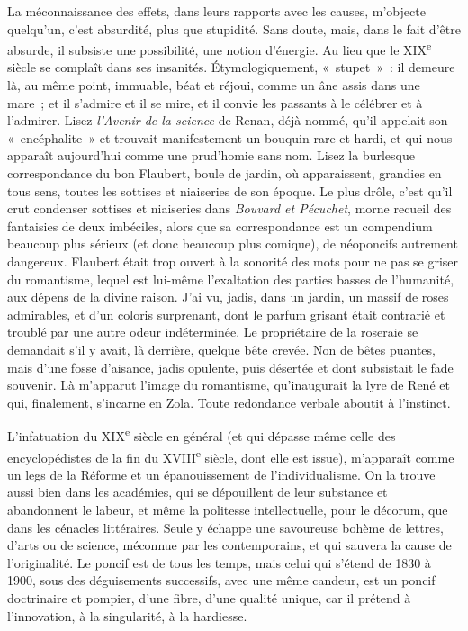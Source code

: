 \documentclass[french,twoside]{book} %
\begin{document}
La méconnaissance des effets, dans leurs rapports avec les causes, m’objecte quelqu’un, c’est absurdité, plus que stupidité. Sans doute, mais, dans le fait d’être absurde, il subsiste une possibilité, une notion d’énergie. Au lieu que le XIX\textsuperscript{e} siècle se complaît dans ses insanités. Étymologiquement, « stupet » : il demeure là, au même point, immuable, béat et réjoui, comme un âne assis dans une mare ; et il s’admire et il se mire, et il convie les passants à le célébrer et à l’admirer. Lisez {\itshape l’Avenir de la science} de Renan, déjà nommé, qu’il appelait son « encéphalite » et trouvait manifestement un bouquin rare et hardi, et qui nous apparaît aujourd’hui comme une prud’homie sans nom. Lisez la burlesque correspondance du bon Flaubert, boule de jardin, où apparaissent, grandies en tous sens, toutes les sottises et niaiseries de son époque. Le plus drôle, c’est qu’il crut condenser sottises et niaiseries dans {\itshape Bouvard et Pécuchet}, morne recueil des fantaisies de deux imbéciles, alors que sa correspondance est un compendium beaucoup plus sérieux (et donc beaucoup plus comique), de néoponcifs autrement dangereux. Flaubert était trop ouvert à la sonorité des mots pour ne pas se griser du romantisme, lequel est lui-même l’exaltation des parties basses de l’humanité, aux dépens de la divine raison. J’ai vu, jadis, dans un jardin, un massif de roses admirables, et d’un coloris surprenant, dont le parfum grisant était contrarié et troublé par une autre odeur indéterminée. Le propriétaire de la roseraie se demandait s’il y avait, là derrière, quelque bête crevée. Non de bêtes puantes, mais d’une fosse d’aisance, jadis opulente, puis désertée et dont subsistait le fade souvenir. Là m’apparut l’image du romantisme, qu’inaugurait la lyre de René et qui, finalement, s’incarne en Zola. Toute redondance verbale aboutit à l’instinct.\par
L’infatuation du XIX\textsuperscript{e} siècle en général (et qui dépasse même celle des encyclopédistes de la fin du XVIII\textsuperscript{e} siècle, dont elle est issue), m’apparaît comme un legs de la Réforme et un épanouissement de l’individualisme. On la trouve aussi bien dans les académies, qui se dépouillent de leur substance et abandonnent le labeur, et même la politesse intellectuelle, pour le décorum, que dans les cénacles littéraires. Seule y échappe une savoureuse bohème de lettres, d’arts ou de science, méconnue par les contemporains, et qui sauvera la cause de l’originalité. Le poncif est de tous les temps, mais celui qui s’étend de 1830 à 1900, sous des déguisements successifs, avec une même candeur, est un poncif doctrinaire et pompier, d’une fibre, d’une qualité unique, car il prétend à l’innovation, à la singularité, à la hardiesse.\par
\end{document}
